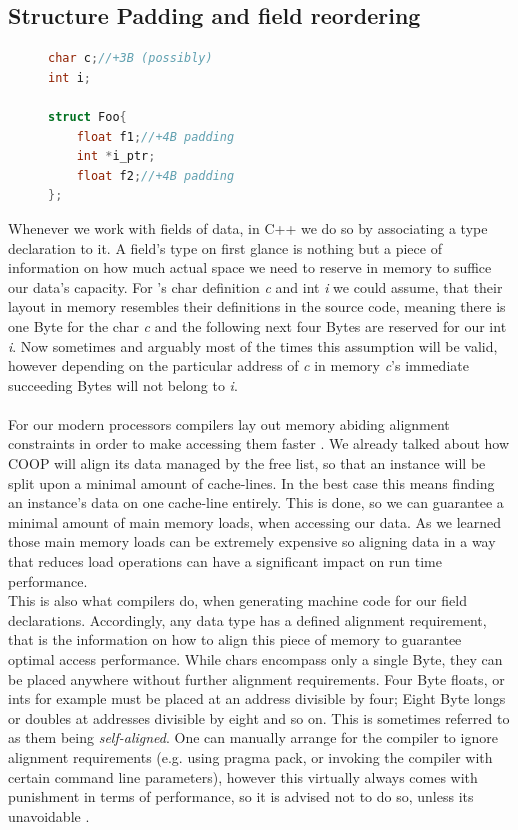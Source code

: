 \subsection{Structure Padding and field reordering}
\begin{figure}
\vspace{-1cm}
\begin{lstlisting}[language=C++,numbers=none,name={Example field declarations to elaborate on structure padding},label={padding}]
char c;//+3B (possibly)
int i;

struct Foo{
	float f1;//+4B padding
	int *i_ptr;
	float f2;//+4B padding
};
\end{lstlisting}
\end{figure}
Whenever we work with fields of data, in C++ we do so by associating a type declaration to it. A field's type on first glance is nothing but a piece of information on how much actual space we need to reserve in memory to suffice our data's capacity. For 's char definition \textit{c} and int \textit{i} we could assume, that their layout in memory resembles their definitions in the source code, meaning there is one Byte for the char \textit{c} and the following next four Bytes are reserved for our int \textit{i}. Now sometimes and arguably most of the times this assumption will be valid, however depending on the particular address of \textit{c} in memory \textit{c}'s immediate succeeding Bytes will not belong to \textit{i}.\\\\
For our modern processors compilers lay out memory abiding alignment constraints in order to make accessing them faster . We already talked about how COOP will align its data managed by the free list, so that an instance will be split upon a minimal amount of cache-lines. In the best case this means finding an instance's data on one cache-line entirely. This is done, so we can guarantee a minimal amount of main memory loads, when accessing our data. As we learned those main memory loads can be extremely expensive so aligning data in a way that reduces load operations can have a significant impact on run time performance.\\
This is also what compilers do, when generating machine code for our field declarations. Accordingly, any data type has a defined alignment requirement, that is the information on how to align this piece of memory to guarantee optimal access performance. While chars encompass only a single Byte, they can be placed anywhere without further alignment requirements. Four Byte floats, or ints for example must be placed at an address divisible by four; Eight Byte longs or doubles at addresses divisible by eight and so on. This is sometimes referred to as them being \textit{self-aligned}. One can manually arrange for the compiler to ignore alignment requirements (e.g. using pragma pack, or invoking the compiler with certain command line parameters), however this virtually always comes with punishment in terms of performance, so it is advised not to do so, unless its unavoidable .\\
